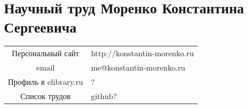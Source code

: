 \documentclass[onecolumn]{article}
\begin{document}
\section*{Научный труд Моренко Константина Сергеевича}

\center{\today}
\begin{tabular}{c l}
  Персональный сайт & http://konstantin-morenko.ru \\
  email & me@konstantin-morenko.ru \\
  Профиль в elibrary.ru & ? \\
  Список трудов & github? \\
\end{tabular}

\nocite{*}
\printbibliography[heading=none,keyword={konstantin-morenko}]
\end{document}
